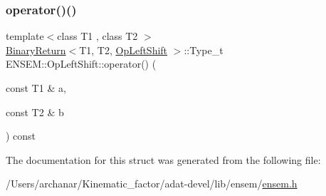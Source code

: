 \subsubsection{\texorpdfstring{operator()()}{operator()()}\hspace{0.1cm}{\footnotesize\ttfamily [3/3]}}
{\footnotesize\ttfamily template$<$class T1 , class T2 $>$ \\
\mbox{\hyperlink{structENSEM_1_1BinaryReturn}{Binary\+Return}}$<$T1, T2, \mbox{\hyperlink{structENSEM_1_1OpLeftShift}{Op\+Left\+Shift}} $>$\+::Type\+\_\+t E\+N\+S\+E\+M\+::\+Op\+Left\+Shift\+::operator() (\begin{DoxyParamCaption}\item[{const T1 \&}]{a,  }\item[{const T2 \&}]{b }\end{DoxyParamCaption}) const\hspace{0.3cm}{\ttfamily [inline]}}



The documentation for this struct was generated from the following file\+:\begin{DoxyCompactItemize}
\item 
/\+Users/archanar/\+Kinematic\+\_\+factor/adat-\/devel/lib/ensem/\mbox{\hyperlink{adat-devel_2lib_2ensem_2ensem_8h}{ensem.\+h}}\end{DoxyCompactItemize}
